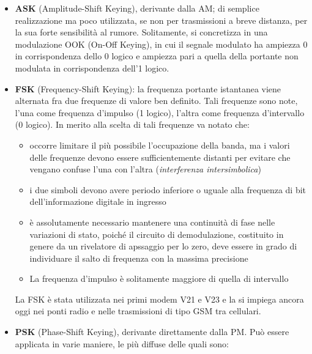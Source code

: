 \documentclass[a4paper,11pt]{article}
\begin{document}
\begin{itemize}
\item \textbf{ASK} (Amplitude-Shift Keying), derivante dalla AM; di semplice realizzazione ma poco utilizzata, se non per trasmissioni a breve distanza, per la sua forte sensibilità al rumore. Solitamente, si concretizza in una modulazione OOK (On-Off Keying), in cui il segnale modulato ha ampiezza 0 in corrispondenza dello 0 logico e ampiezza pari a quella della portante non modulata in corrispondenza dell'1 logico.
\item \textbf{FSK} (Frequency-Shift Keying): la frequenza portante istantanea viene alternata fra due frequenze di valore ben definito. Tali frequenze sono note, l'una come frequenza d'impulso (1 logico), l'altra come frequenza d'intervallo (0 logico). In merito alla scelta di tali frequenze va notato che:
\begin{itemize}
\item occorre limitare il più possibile l'occupazione della banda, ma i valori delle frequenze devono essere sufficientemente distanti per evitare che vengano confuse l'una con l'altra (\textit{interferenza intersimbolica})
\item i due simboli devono avere periodo inferiore o uguale alla frequenza di bit dell'informazione digitale in ingresso
\item è assolutamente necessario mantenere una continuità di fase nelle variazioni di stato, poiché il circuito di demodulazione, costituito in genere da un rivelatore di apssaggio per lo zero, deve essere in grado di individuare il salto di frequenza con la massima precisione
\item La frequenza d'impulso è solitamente maggiore di quella di intervallo
\end{itemize}
La FSK è stata utilizzata nei primi modem V21 e V23 e la si impiega ancora oggi nei ponti radio e nelle trasmissioni di tipo GSM tra cellulari.
\item \textbf{PSK} (Phase-Shift Keying), derivante direttamente dalla PM. Può essere applicata in varie maniere, le più diffuse delle quali sono:
\begin{figure}[h]
\centering

\end{figure}
\end{itemize}
\end{document}
